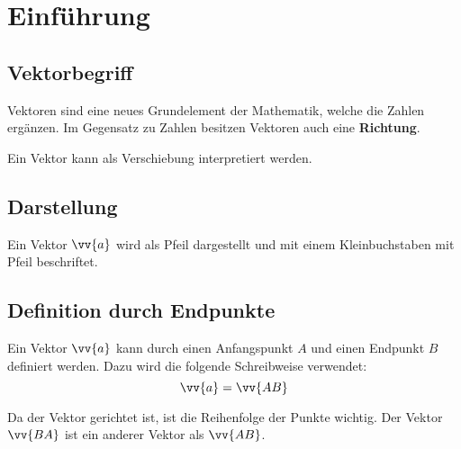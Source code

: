\newpage
\section{Einführung}

\subsection{Vektorbegriff}

Vektoren sind eine neues Grundelement der Mathematik, welche die Zahlen ergänzen. Im Gegensatz zu Zahlen besitzen Vektoren auch eine \textbf{Richtung}.

Ein Vektor kann als Verschiebung interpretiert werden.

\subsection{Darstellung}

Ein Vektor $\vv{a}$ wird als Pfeil dargestellt und mit einem Kleinbuchstaben mit Pfeil beschriftet.
\begin{center}
\end{center}

\subsection{Definition durch Endpunkte}

Ein Vektor $\vv{a}$ kann durch einen Anfangspunkt $A$ und einen Endpunkt $B$ definiert werden. Dazu wird die folgende Schreibweise verwendet:
\[
  \vv{a} = \vv{AB}
\]
\begin{center}
\end{center}
Da der Vektor gerichtet ist, ist die Reihenfolge der Punkte wichtig. Der Vektor $\vv{BA}$ ist ein anderer Vektor als $\vv{AB}$.

